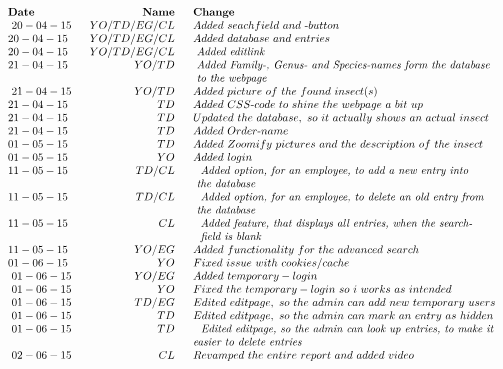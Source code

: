 \documentclass[12pt,a4paper]{article}
\begin{document}
	$$
	\begin{array}{lrl}
	\bf{Date}~&~\bf{Name}~&~\bf{Change}~\\~
	20-04-15~&~YO/TD/EG/CL~&~Added~seachfield~and~\text{-}button~\\
	20-04-15~&~YO/TD/EG/CL~&~Added~database~and~entries~\\
	20-04-15~&~YO/TD/EG/CL~&~\vtop{\hbox{\strut~\emph{Added~edit\-link}}}~\\
	21-04-15~&~YO/TD~&~\vtop{\hbox{\strut~\emph{Added~Family\text{-},~Genus\text{-}~and~Species\text{-}names~form~the~database}}\hbox{\strut~\emph{to~the~webpage}}}~~\\~
	21-04-15~&~YO/TD~&~Added~picture~of~the~found~insect(s)~\\
	21-04-15~&~TD~&~Added~CSS\text{-}code~to~shine~the~webpage~a~bit~up~\\
	21-04-15~&~TD~&~Updated~the~database,~so~it~actually~shows~an~actual~insect\\
	21-04-15~&~TD~&~Added~Order\text{-}name\\
	01-05-15~&~TD~&~Added~Zoomify~pictures~and~the~description~of~the~insect\\
	01-05-15~&~YO~&~Added~login\\
	11-05-15~&~TD/CL~&~\vtop{\hbox{\strut~\emph{	Added~option,~for~an~employee,~to~add~a~new~entry~into~}}\hbox{\strut~\emph{the~database}}}~\\
	11-05-15~&~TD/CL~&~\vtop{\hbox{\strut~\emph{	Added~option,~for~an~employee,~to~delete~an~old~entry~from}}\hbox{\strut~\emph{the~database}}}~\\
	11-05-15~&~CL~&~\vtop{\hbox{\strut~\emph{	Added~feature,~that~displays~all~entries,~when~the~search\text{-}}}\hbox{\strut~\emph{~field~is~blank}}}\\
	11-05-15~&~YO/EG~&~Added~functionality~for~the~advanced~search\\
	01-06-15~&~YO~&~Fixed~issue~with~cookies/cache~\\~
	01-06-15~&~YO/EG~&~Added~temporary-login~\\~
	01-06-15~&~YO~&~Fixed~the~temporary-login~so~i~works~as~intended~\\~
	01-06-15~&~TD/EG~&~Edited~editpage,~so~the~admin~can~add~new~temporary~users~\\~
	01-06-15~&~TD~&~Edited~editpage,~so~the~admin~can~mark~an~entry~as~hidden~\\~
	01-06-15~&~TD~&\vtop{\hbox{\strut~\emph{	~Edited~editpage,~so~the~admin~can~look~up~entries,~to~make~it~}}\hbox{\strut~\emph{easier~to~delete~entries}}}\\~
	02-06-15~&~CL~&~Revamped~the~entire~report~and~added~video
	\end{array}
	$$
\end{document}

